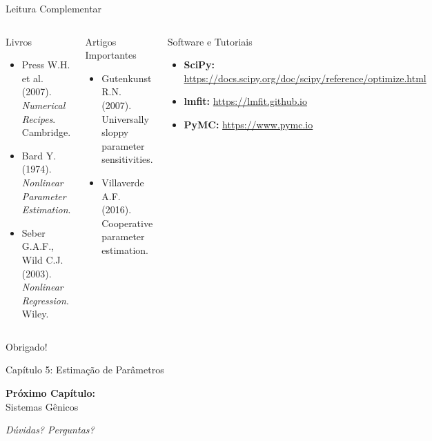 \begin{frame}{Leitura Complementar}
\begin{columns}
\begin{block}{Livros}\scriptsize
\begin{itemize}
    \item Press W.H. et al. (2007). \textit{Numerical Recipes}. Cambridge.
    \item Bard Y. (1974). \textit{Nonlinear Parameter Estimation}.
    \item Seber G.A.F., Wild C.J. (2003). \textit{Nonlinear Regression}. Wiley.
\end{itemize}
\end{block}

\begin{block}{Artigos Importantes}\scriptsize
\begin{itemize}
    \item Gutenkunst R.N. (2007). Universally sloppy parameter sensitivities.
    \item Villaverde A.F. (2016). Cooperative parameter estimation.
\end{itemize}
\end{block}

\begin{block}{Software e Tutoriais}\scriptsize
\begin{itemize}
    \item \textbf{SciPy:} \url{https://docs.scipy.org/doc/scipy/reference/optimize.html}
    \item \textbf{lmfit:} \url{https://lmfit.github.io}
    \item \textbf{PyMC:} \url{https://www.pymc.io}
\end{itemize}
\end{block}
\end{columns}
\end{frame}

\begin{frame}
\begin{center}
{\Huge Obrigado!}

\vspace{1cm}

{\Large Capítulo 5: Estimação de Parâmetros}

\vspace{1cm}

\textbf{Próximo Capítulo:}\\
Sistemas Gênicos

\vspace{1cm}

\textit{Dúvidas? Perguntas?}
\end{center}
\end{frame}


